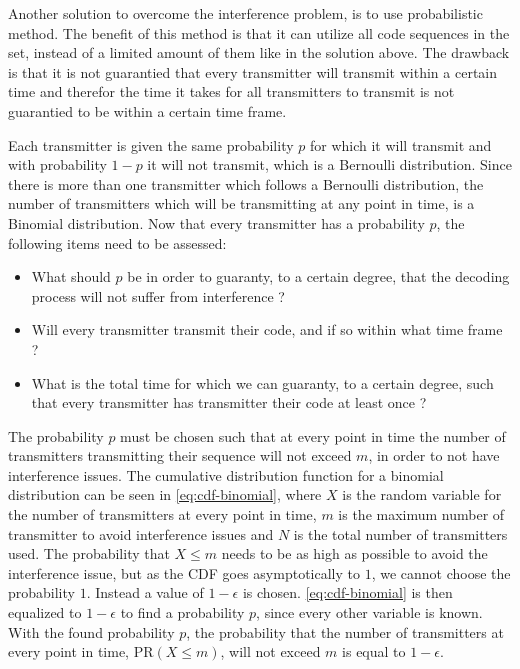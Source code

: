 Another solution to overcome the interference problem, is to use probabilistic method.
The benefit of this method is that it can utilize all code sequences in the set, instead of a limited amount of them like in the solution above.
The drawback is that it is not guarantied that every transmitter will transmit within a certain time and therefor the time it takes for all transmitters to transmit is not guarantied to be within a certain time frame.


Each transmitter is given the same probability $p$ for which it will transmit and with probability $1 - p$ it will not transmit, which is a Bernoulli distribution.
Since there is more than one transmitter which follows a Bernoulli distribution, the number of transmitters which will be transmitting at any point in time, is a Binomial distribution.
Now that every transmitter has a probability $p$, the following items need to be assessed:

\begin{itemize}
	\item What should $p$ be in order to guaranty, to a certain degree, that the decoding process will not suffer from interference ?
	\item Will every transmitter transmit their code, and if so within what time frame ?
	\item What is the total time for which we can guaranty, to a certain degree, such that every transmitter has transmitter their code at least once ? 
\end{itemize}



The probability $p$ must be chosen such that at every point in time the number of transmitters transmitting their sequence will not exceed $m$, in order to not have interference issues.
The cumulative distribution function for a binomial distribution can be seen in \autoref{eq:cdf-binomial}, where $X$ is the random variable for the number of transmitters at every point in time, $m$ is the maximum number of transmitter to avoid interference issues and $N$ is the total number of transmitters used.
The probability that $X \le m$ needs to be as high as possible to avoid the interference issue, but as the CDF goes asymptotically to $1$, we cannot choose the probability $1$.
Instead a value of $1 - \epsilon$ is chosen.
\autoref{eq:cdf-binomial} is then equalized to $1 - \epsilon$ to find a probability $p$, since every other variable is known.
With the found probability $p$, the probability that the number of transmitters at every point in time, PR$(X \le m)$, will not exceed $m$ is equal to $1 - \epsilon$.

